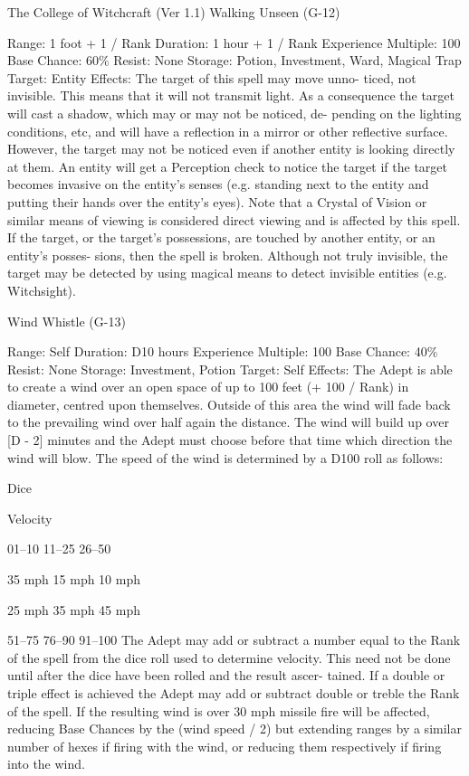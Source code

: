 \begin{Chapter}{The College of Witchcraft (Ver 1.1)}
Walking Unseen (G-12) 

Range: 1 foot + 1 / Rank 
Duration: 1 hour + 1 / Rank 
Experience Multiple: 100 
Base Chance: 60\% 
Resist: None 
Storage: Potion, Investment, Ward, Magical Trap 
Target: Entity 
Effects:  The  target  of  this  spell  may  move  unno-
ticed,  not  invisible.  This  means  that  it  will  not 
transmit light. As a consequence the target will cast 
a  shadow,  which  may  or  may  not  be  noticed,  de-
pending  on  the  lighting  conditions,  etc,  and  will 
have  a  reflection  in  a  mirror  or  other  reflective 
surface.  However,  the  target  may  not  be  noticed 
even  if  another  entity  is  looking  directly  at  them. 
An entity will get a Perception check to notice the 
target if the target becomes invasive on the entity’s 
senses (e.g. standing next to the entity and putting 
their  hands  over  the  entity’s  eyes).  Note  that  a 
Crystal  of  Vision  or  similar  means  of  viewing  is 
considered  direct  viewing  and  is  affected  by  this 
spell.  If  the  target,  or  the  target’s  possessions,  are 
touched  by  another  entity,  or  an  entity’s  posses-
sions,  then  the  spell  is  broken.  Although  not  truly 
invisible,  the  target  may  be  detected  by  using 
magical  means  to  detect  invisible  entities  (e.g. 
Witchsight). 

Wind Whistle (G-13) 

Range: Self 
Duration: D10 hours 
Experience Multiple: 100 
Base Chance: 40\% 
Resist: None 
Storage: Investment, Potion 
Target: Self 
Effects: The Adept is able to create a wind over an 
open  space  of  up  to  100  feet  (+  100  /  Rank)  in 
diameter, centred upon themselves. Outside of this 
area the wind will fade back to the prevailing wind 
over half again the distance. The wind will build up 
over  [D  -  2]  minutes  and  the  Adept  must  choose 
before  that  time  which  direction  the  wind  will 
blow.  The  speed  of  the  wind  is  determined  by  a 
D100 roll as follows: 

Dice 

Velocity 

01–10 
11–25 
26–50 

35 mph 
15 mph 
10 mph 

25 mph 
35 mph 
45 mph 

51–75 
76–90 
91–100 
The  Adept  may  add  or  subtract  a number  equal to 
the  Rank  of  the  spell  from  the  dice  roll  used  to 
determine  velocity.  This  need  not  be  done  until 
after the dice have been rolled and the result ascer-
tained.  If  a  double  or  triple  effect  is  achieved  the 
Adept  may  add  or  subtract  double  or  treble  the 
Rank  of  the  spell.  If  the  resulting  wind  is  over  30 
mph  missile  fire  will  be  affected,  reducing  Base 
Chances  by  the  (wind  speed  /  2)  but  extending 
ranges  by  a  similar  number  of  hexes  if  firing  with 
the  wind,  or  reducing  them  respectively  if  firing 
into the wind. 



\end{Chapter}
